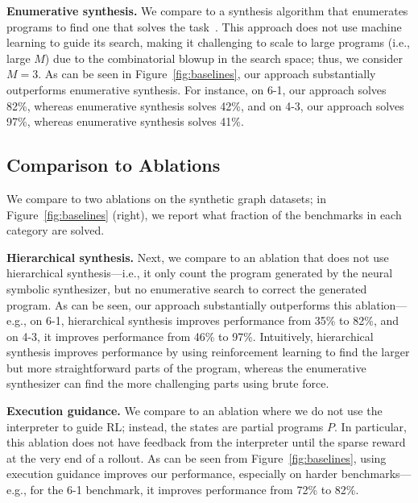 \textbf{Enumerative synthesis.}
%
We compare to a synthesis algorithm that enumerates programs to find one that solves the task~\cite{alur2013syntax}. This approach does not use machine learning to guide its search, making it challenging to scale to large programs (i.e., large $M$) due to the combinatorial blowup in the search space; thus, we consider $M=3$. As can be seen in Figure~\ref{fig:baselines}, our approach substantially outperforms enumerative synthesis. For instance, on 6-1, our approach solves 82\%, whereas enumerative synthesis solves 42\%, and on 4-3, our approach solves 97\%, whereas enumerative synthesis solves 41\%.

%

\subsection{Comparison to Ablations}

We compare to two ablations on the synthetic graph datasets; in Figure~\ref{fig:baselines} (right), we report what fraction of the benchmarks in each category are solved.

\textbf{Hierarchical synthesis.}
%
Next, we compare to an ablation that does not use hierarchical synthesis---i.e., it only count the program generated by the neural symbolic synthesizer, but no enumerative search to correct the generated program. As can be seen, our approach substantially outperforms this ablation---e.g., on 6-1, hierarchical synthesis improves performance from 35\% to 82\%, and on 4-3, it improves performance from 46\% to 97\%. Intuitively, hierarchical synthesis improves performance by using reinforcement learning to find the larger but more straightforward parts of the program, whereas the enumerative synthesizer can find the more challenging parts using brute force.

\textbf{Execution guidance.}
%
We compare to an ablation where we do not use the interpreter to guide RL; instead, the states are partial programs $P$. In particular, this ablation does not have feedback from the interpreter until the sparse reward at the very end of a rollout. As can be seen from Figure~\ref{fig:baselines}, using execution guidance improves our performance, especially on harder benchmarks---e.g., for the 6-1 benchmark, it improves performance from 72\% to 82\%.


